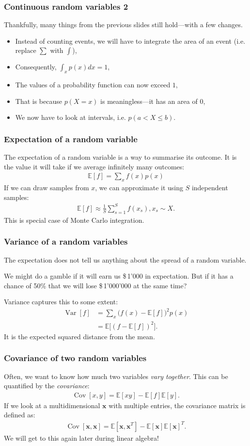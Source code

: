 \documentclass[USenglish,pdftex,compress,10pt,svgnamesi,handout]{beamer}
\def\Vec#1{\textbf{#1}}
\newcommand{\eq}[1]{\begin{align*}#1\end{align*}}
\newcommand{\expc}{\mathbb{E}}
\newcommand{\vari}{\operatorname{Var}}
\newcommand{\covari}[2]{\operatorname{Cov}[#1,#2]}
\begin{document}
\begin{frame}
\frametitle{Continuous random variables 2}
Thankfully, many things from the previous slides still hold---with a few changes.
\begin{itemize}
    \item Instead of counting events, we will have to integrate the area of an event (i.e. replace $\sum$ with $\int$),
    \item Consequently, $\int_x p(x) dx = 1$,
    \item The values of a probability function can now exceed $1$,
    \item That is because $p(X=x)$ is meaningless---it has an area of $0$,
    \item We now have to look at intervals, i.e. $p(a < X \leq b)$.
\end{itemize}
\end{frame}


\begin{frame}
\frametitle{Expectation of a random variable}
The expectation of a random variable is a way to summarise its outcome.
It is the value it will take if we average infinitely many outcomes:
\eq{
    \expc[f] = \sum_x f(x) p(x)
}
If we can draw samples from $x$, we can approximate it using $S$ independent samples:
\eq{
    \expc[f] \approx \frac{1}{S} \sum_{s=1}^S f(x_s), x_s \sim X.
}
This is special case of Monte Carlo integration.
\end{frame}


\begin{frame}
\frametitle{Variance of a random variables}
The expectation does not tell us anything about the spread of a random variable.

We might do a gamble if it will earn us \$\,1'000 in expectation. But if it has a chance of 50\% that we will lose \$\,1'000'000 at the same time?

Variance captures this to some extent:
\eq{
    \vari[f] &= \sum_x \bigl(f(x) - \expc[f]\bigr)^2 p(x) \\
        &= \expc\bigl[(f - \expc[f])^2\bigr].
}
It is the expected squared distance from the mean.
\end{frame}



\begin{frame}
\frametitle{Covariance of two random variables}
Often, we want to know how much two variables \emph{vary together}. 
This can be quantified by the \emph{covariance}:
\eq{
    \covari{x}{y} = \expc[xy] - \expc[f]\expc[y].
}
If we look at a multidimensional $\Vec{x}$ with multiple entries, the covariance matrix is defined as:
\eq{
    \covari{\Vec{x}}{\Vec{x}} = \expc[\Vec{x},\Vec{x}^T] - \expc[\Vec{x}]\expc[\Vec{x}]^T.
}
We will get to this again later during linear algebra!
\end{frame}
\end{document}
